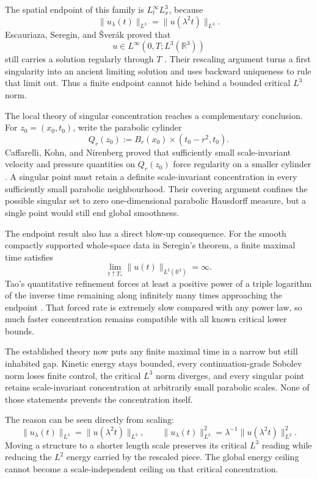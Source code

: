 The spatial endpoint of this family is \(L^\infty_tL^3_x\), because
\[
  \lVert u_\lambda(t)\rVert_{L^3}
  =
  \lVert u(\lambda^2t)\rVert_{L^3}.
\]
Escauriaza, Seregin, and \v{S}ver{\'a}k proved that
\[
  u\in L^\infty(0,T;L^3(\mathbb R^3))
\]
still carries a solution regularly through \(T\) \parencite{EscauriazaSereginSverak2003}.
Their rescaling argument turns a first singularity into an ancient limiting solution and uses backward uniqueness to rule that limit out.
Thus a finite endpoint cannot hide behind a bounded critical \(L^3\) norm.

The local theory of singular concentration reaches a complementary conclusion.
For \(z_0=(x_0,t_0)\), write the parabolic cylinder
\[
  Q_r(z_0)
  :=
  B_r(x_0)\times(t_0-r^2,t_0).
\]
Caffarelli, Kohn, and Nirenberg proved that sufficiently small scale-invariant velocity and pressure quantities on \(Q_r(z_0)\) force regularity on a smaller cylinder \parencite{CaffarelliKohnNirenberg1982}.
A singular point must retain a definite scale-invariant concentration in every sufficiently small parabolic neighbourhood.
Their covering argument confines the possible singular set to zero one-dimensional parabolic Hausdorff measure, but a single point would still end global smoothness.

The endpoint result also has a direct blow-up consequence.
For the smooth compactly supported whole-space data in Seregin's theorem, a finite maximal time satisfies \parencite{Seregin2012}
\[
  \lim_{t\uparrow T_*}
  \lVert u(t)\rVert_{L^3(\mathbb R^3)}
  =\infty.
\]
Tao's quantitative refinement forces at least a positive power of a triple logarithm of the inverse time remaining along infinitely many times approaching the endpoint \parencite{Tao2021Quantitative}.
That forced rate is extremely slow compared with any power law, so much faster concentration remains compatible with all known critical lower bounds.


The established theory now puts any finite maximal time in a narrow but still inhabited gap.
Kinetic energy stays bounded, every continuation-grade Sobolev norm loses finite control, the critical \(L^3\) norm diverges, and every singular point retains scale-invariant concentration at arbitrarily small parabolic scales.
None of those statements prevents the concentration itself.

The reason can be seen directly from scaling:
\[
  \lVert u_\lambda(t)\rVert_{L^3}
  =
  \lVert u(\lambda^2t)\rVert_{L^3},
  \qquad
  \lVert u_\lambda(t)\rVert_{L^2}^2
  =
  \lambda^{-1}
  \lVert u(\lambda^2t)\rVert_{L^2}^2.
\]
Moving a structure to a shorter length scale preserves its critical \(L^3\) reading while reducing the \(L^2\) energy carried by the rescaled piece.
The global energy ceiling cannot become a scale-independent ceiling on that critical concentration.

